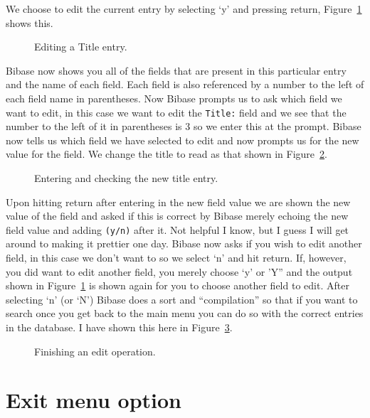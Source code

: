 \documentclass[12pt,a4paper]{book}
\newcommand {\fig}[1] {Figure~\ref{#1}}
\begin{document}
We choose to edit the current entry by selecting `y' and pressing 
return, \fig{fig:editTitle} shows this.
\begin{figure}[!ht]
\centerline{}
\caption{Editing a Title entry.}
\label{fig:editTitle}
\end{figure}
Bibase now shows you all of the fields that are present in this 
particular entry and the name of each field.  Each field is also 
referenced by a number to the left of each field name in parentheses.  
Now Bibase prompts us to ask which field we want to edit, in this case 
we want to edit the {\tt Title:} field and we see that the number to 
the left of it in parentheses is 3 so we enter this at the prompt.  
Bibase now tells us which field we have selected to edit and now 
prompts us for the new value for the field.  We change the title to 
read as that shown in \fig{fig:editCheck}.
\begin{figure}[!ht]
\centerline{}
\caption{Entering and checking the new title entry.}
\label{fig:editCheck}
\end{figure}
Upon hitting return after entering in the new field value we are shown 
the new value of the field and asked if this is correct by Bibase 
merely echoing the new field value and adding {\tt (y/n)} after it.  
Not helpful I know, but I guess I will get around to making it 
prettier one day.  Bibase now asks if you wish to edit another field, 
in this case we don't want to so we select `n' and hit return.  If, 
however, you did want to edit another field, you merely choose `y' 
or 'Y'' and the output shown in \fig{fig:editTitle} is shown again for 
you to choose another field to edit.  After selecting `n' (or `N') 
Bibase does a sort and ``compilation'' so that if you want to search 
once you get back to the main menu you can do so with the correct 
entries in the database.  I have shown this here in 
\fig{fig:editFinish}.
\begin{figure}[!ht]
\centerline{}
\caption{Finishing an edit operation.}
\label{fig:editFinish}
\end{figure}

\section{Exit menu option}
\end{document}
